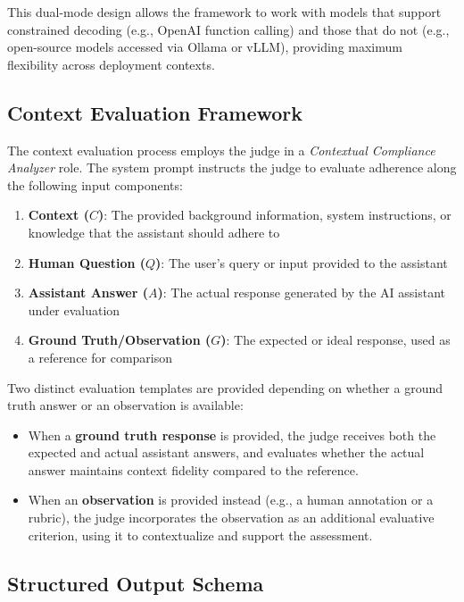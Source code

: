 \documentclass[11pt,a4paper]{article}
\begin{document}
This dual-mode design allows the framework to work with models that support constrained decoding (e.g., OpenAI function calling) and those that do not (e.g., open-source models accessed via Ollama or vLLM), providing maximum flexibility across deployment contexts.

\subsection{Context Evaluation Framework}

The context evaluation process employs the judge in a \emph{Contextual Compliance Analyzer} role. The system prompt instructs the judge to evaluate adherence along the following input components:

\begin{enumerate}
    \item \textbf{Context ($C$)}: The provided background information, system instructions, or knowledge that the assistant should adhere to
    \item \textbf{Human Question ($Q$)}: The user's query or input provided to the assistant
    \item \textbf{Assistant Answer ($A$)}: The actual response generated by the AI assistant under evaluation
    \item \textbf{Ground Truth/Observation ($G$)}: The expected or ideal response, used as a reference for comparison
\end{enumerate}

Two distinct evaluation templates are provided depending on whether a ground truth answer or an observation is available:

\begin{itemize}
    \item When a \textbf{ground truth response} is provided, the judge receives both the expected and actual assistant answers, and evaluates whether the actual answer maintains context fidelity compared to the reference.
    \item When an \textbf{observation} is provided instead (e.g., a human annotation or a rubric), the judge incorporates the observation as an additional evaluative criterion, using it to contextualize and support the assessment.
\end{itemize}

\subsection{Structured Output Schema}
\end{document}
